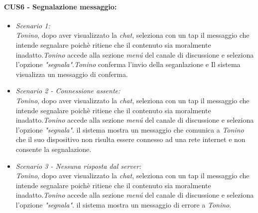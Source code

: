 \paragraph{CUS6 - Segnalazione messaggio:\\}
\begin{itemize}
\item \textit{Scenario 1:\\}
\textit{Tonino}, dopo aver visualizzato la \textit{chat}, seleziona con un tap il messaggio che intende segnalare poichè ritiene che il contenuto sia moralmente inadatto.\textit{Tonino} accede alla sezione \textit{menú} del canale di discussione e seleziona l'opzione \textit{"segnala"}.\textit{Tonino} conferma l'invio della seganlazione e Il sistema visualizza un messaggio di conferma.\\

\item \textit{Scenario 2 - Connessione assente:\\}
\textit{Tonino}, dopo aver visualizzato la \textit{chat}, seleziona con un tap il messaggio che intende segnalare poichè ritiene che il contenuto sia moralmente inadatto.\textit{Tonino} accede alla sezione \textit{menú} del canale di discussione e seleziona l'opzione \textit{"segnala"}. il sistema mostra un messaggio che comunica a \textit{Tonino} che il suo dispositivo non risulta essere connesso ad una rete internet e non consente la segnalazione.\\

\item \textit{Scenario 3 - Nessuna risposta dal server:\\}
\textit{Tonino}, dopo aver visualizzato la \textit{chat}, seleziona con un tap il messaggio che intende segnalare poichè ritiene che il contenuto sia moralmente inadatto.\textit{Tonino} accede alla sezione \textit{menú} del canale di discussione e seleziona l'opzione \textit{"segnala"}. il sistema mostra un messaggio di errore a \textit{Tonino}.
\end{itemize}

